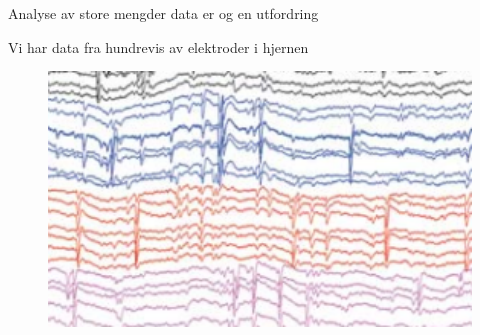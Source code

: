 \documentclass[presentation]{beamer}
\begin{document}
\begin{frame}{Analyse av store mengder data er og en utfordring}

    Vi har data fra hundrevis av elektroder i hjernen
    \begin{figure}
            {\includegraphics[width=1\textwidth]{analyse.png}}
     \end{figure}

\end{frame}
\end{document}
